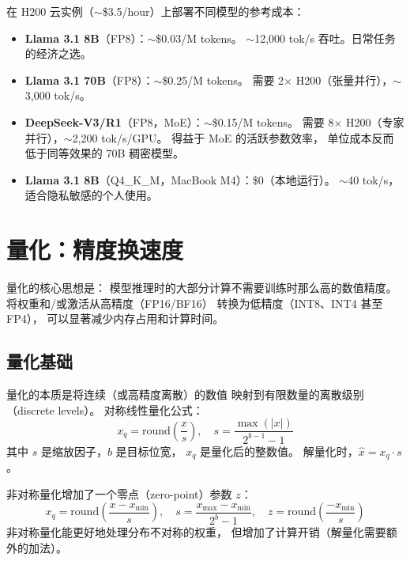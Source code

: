 \begin{keybox}
在 H200 云实例（$\sim$\$3.5/hour）上部署不同模型的参考成本：
\begin{itemize}[noitemsep]
  \item \textbf{Llama 3.1 8B}（FP8）：$\sim$\$0.03/M tokens。
        $\sim$12,000 tok/s 吞吐。日常任务的经济之选。
  \item \textbf{Llama 3.1 70B}（FP8）：$\sim$\$0.25/M tokens。
        需要 2$\times$ H200（张量并行），$\sim$3,000 tok/s。
  \item \textbf{DeepSeek-V3/R1}（FP8，MoE）：$\sim$\$0.15/M tokens。
        需要 8$\times$ H200（专家并行），$\sim$2,200 tok/s/GPU。
        得益于 MoE 的活跃参数效率，
        单位成本反而低于同等效果的 70B 稠密模型。
  \item \textbf{Llama 3.1 8B}（Q4\_K\_M，MacBook M4）：\$0（本地运行）。
        $\sim$40 tok/s，适合隐私敏感的个人使用。
\end{itemize}
\end{keybox}


\section{量化：精度换速度}

量化的核心思想是：
模型推理时的大部分计算不需要训练时那么高的数值精度。
将权重和/或激活从高精度（FP16/BF16）
转换为低精度（INT8、INT4 甚至 FP4），
可以显著减少内存占用和计算时间。

\subsection{量化基础}

量化的本质是将连续（或高精度离散）的数值
映射到有限数量的离散级别（discrete levels）。
对称线性量化公式：
\begin{equation}
  x_q = \mathrm{round}\!\left(\frac{x}{s}\right), \quad
  s = \frac{\max(|x|)}{2^{b-1} - 1}
\end{equation}
其中 $s$ 是缩放因子，$b$ 是目标位宽，
$x_q$ 是量化后的整数值。
解量化时，$\hat{x} = x_q \cdot s$。

非对称量化增加了一个零点（zero-point）参数 $z$：
\begin{equation}
  x_q = \mathrm{round}\!\left(\frac{x - x_{\min}}{s}\right), \quad
  s = \frac{x_{\max} - x_{\min}}{2^b - 1}, \quad
  z = \mathrm{round}\!\left(\frac{-x_{\min}}{s}\right)
\end{equation}
非对称量化能更好地处理分布不对称的权重，
但增加了计算开销（解量化需要额外的加法）。

